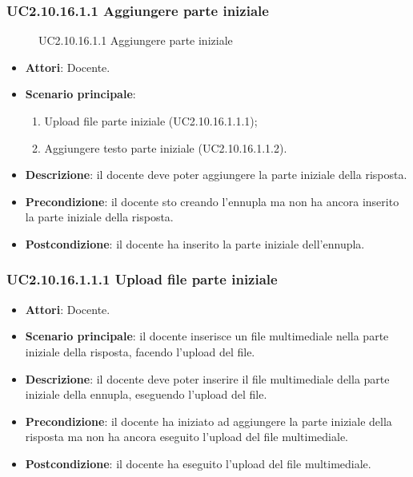 \subsubsection{UC2.10.16.1.1 Aggiungere parte iniziale}
\begin{figure}[H]
\centering
\noindent{}
\caption{UC2.10.16.1.1 Aggiungere parte iniziale}
\end{figure}
\begin{itemize}
\item \textbf{Attori}: Docente.
\item \textbf{Scenario principale}:
\begin{enumerate}
\item Upload file parte iniziale (UC2.10.16.1.1.1);
\item Aggiungere testo parte iniziale (UC2.10.16.1.1.2).
\end{enumerate}
\item \textbf{Descrizione}: il docente deve poter aggiungere la parte iniziale della risposta.
\item \textbf{Precondizione}: il docente sto creando l'ennupla ma non ha ancora inserito la parte iniziale della risposta.
\item \textbf{Postcondizione}: il docente ha inserito la parte iniziale dell'ennupla.
\end{itemize}
\subsubsection{UC2.10.16.1.1.1 Upload file parte iniziale}
\begin{itemize}
\item \textbf{Attori}: Docente.
\item \textbf{Scenario principale}: il docente inserisce un file multimediale nella parte iniziale della risposta, facendo l'upload del file.
\item \textbf{Descrizione}: il docente deve poter inserire il file multimediale della parte iniziale della ennupla, eseguendo l'upload del file.
\item \textbf{Precondizione}: il docente ha iniziato ad aggiungere la parte iniziale della risposta ma non ha ancora eseguito l'upload del file multimediale.
\item \textbf{Postcondizione}: il docente ha eseguito l'upload del file multimediale.
\end{itemize}
